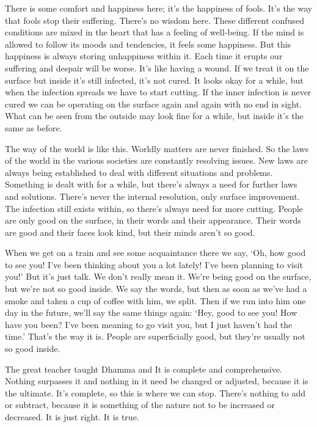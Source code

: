 There is some comfort and happiness here; it's the happiness of fools. It's the way that fools stop their suffering. There's no wisdom here. These different confused conditions are mixed in the heart that has a feeling of well-being. If the mind is allowed to follow its moods and tendencies, it feels some happiness. But this happiness is always storing unhappiness within it. Each time it erupts our suffering and despair will be worse. It's like having a wound. If we treat it on the surface but inside it's still infected, it's not cured. It looks okay for a while, but when the infection spreads we have to start cutting. If the inner infection is never cured we can be operating on the surface again and again with no end in sight. What can be seen from the outside may look fine for a while, but inside it's the same as before. 

The way of the world is like this. Worldly matters are never finished. So the laws of the world in the various societies are constantly resolving issues. New laws are always being established to deal with different situations and problems. Something is dealt with for a while, but there's always a need for further laws and solutions. There's never the internal resolution, only surface improvement. The infection still exists within, so there's always need for more cutting. People are only good on the surface, in their words and their appearance. Their words are good and their faces look kind, but their minds aren't so good. 

When we get on a train and see some acquaintance there we say, `Oh, how good to see you! I've been thinking about you a lot lately! I've been planning to visit you!' But it's just talk. We don't really mean it. We're being good on the surface, but we're not so good inside. We say the words, but then as soon as we've had a smoke and taken a cup of coffee with him, we split. Then if we run into him one day in the future, we'll say the same things again: `Hey, good to see you! How have you been? I've been meaning to go visit you, but I just haven't had the time.' That's the way it is. People are superficially good, but they're usually not so good inside. 

The great teacher taught Dhamma and  It is complete and comprehensive. Nothing surpasses it and nothing in it need be changed or adjusted, because it is the ultimate. It's complete, so this is where we can stop. There's nothing to add or subtract, because it is something of the nature not to be increased or decreased. It is just right. It is true. 

